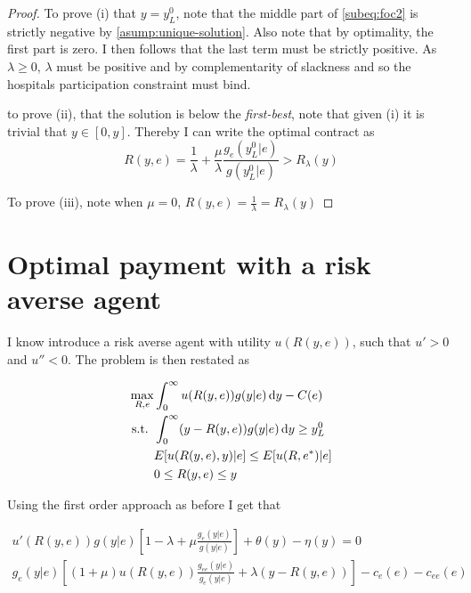 \begin{proof}
		To prove (i) that $y=y_L^0$, note that the middle part of \cref{subeq:foc2} is strictly negative by \cref{asump:unique-solution}. Also note that by optimality, the first part is zero. I then follows that the last term must be strictly positive. As $\lambda\geq0$, $\lambda$ must be positive and by complementarity of slackness and so the hospitals participation constraint must bind. 
								
		to prove (ii), that the solution is below the \emph{first-best}, note that given (i) it is trivial that $y\in[0,y]$. Thereby I can write the optimal contract as 
		\[
			R(y,e)=\frac{1}{\lambda}+\frac{\mu}{\lambda}\frac{g_e(y_L^0|e)}{g(y_L^0|e)}>R_\lambda(y)
		\]
								
		To prove (iii), note when $\mu=0$, $R(y,e)=\frac{1}{\lambda}=R_\lambda(y)$
								
	\end{proof} 
	\section{Optimal payment with a risk averse agent} %
	\label{sec:optimal_payment_with_a_risk_averse_agent}
	I know introduce a risk averse agent with utility $u(R(y,e))$, such that $u'>0$ and $u''<0$. The problem is then restated as 
				
	\begin{subequations}
		\label{eq:ktRa}
		\begin{align}
			\max_{R,e}   & \int_0^{\infty}u(R(y,e))g(y|e)\dif y-C(e)\label{subeq:ktRa1}           \\
			\text{s.t. } & \int_{0}^{\infty} (y-R(y,e))g(y|e)\dif y\geq y_L^0 \label{subeq:ktRa2} \\
			             & E[u(R(y,e),y)|e]\leq E[u(R,e^*)|e] \label{subeq:ktRa3}                 \\
			             & 0\leq R(y,e)\leq y \label{subeq:ktRa4}                                 
		\end{align}
	\end{subequations}
				
	Using the first order approach as before I get that 
				
	\begin{subequations}
		\label{eq:lagrange-ra}
		\begin{align}
			u'(R(y,e))g(y|e)\left[1-\lambda+\mu \frac{g_e(y|e)}{g(y|e)}\right] + \theta(y)-\eta(y)=0             \\
			g_e(y|e)\left[(1+\mu)u(R(y,e))\frac{g_{ee}(y|e)}{g_e(y|e)}+\lambda(y-R(y,e))\right]-c_e(e)-c_{ee}(e) 
		\end{align}
	\end{subequations}
				
